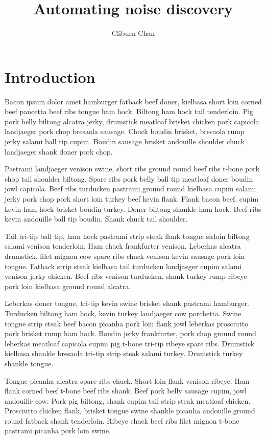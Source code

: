 \documentclass{article}
\begin{document}
\title{Automating noise discovery}
\author{Cliburn Chan}
\maketitle

\section{Introduction}

Bacon ipsum dolor amet hamburger fatback beef doner, kielbasa short loin corned beef pancetta beef ribs tongue ham hock. Biltong ham hock tail tenderloin. Pig pork belly biltong alcatra jerky, drumstick meatloaf brisket chicken pork capicola landjaeger pork chop bresaola sausage. Chuck boudin brisket, bresaola rump jerky salami ball tip cupim. Boudin sausage brisket andouille shoulder chuck landjaeger shank doner pork chop.

Pastrami landjaeger venison swine, short ribs ground round beef ribs t-bone pork chop tail shoulder biltong. Spare ribs pork belly ball tip meatloaf doner boudin jowl capicola. Beef ribs turducken pastrami ground round kielbasa cupim salami jerky pork chop pork short loin turkey beef kevin flank. Flank bacon beef, cupim kevin ham hock brisket boudin turkey. Doner biltong shankle ham hock. Beef ribs kevin andouille ball tip boudin. Shank chuck tail shoulder.

Tail tri-tip ball tip, ham hock pastrami strip steak flank tongue sirloin biltong salami venison tenderloin. Ham chuck frankfurter venison. Leberkas alcatra drumstick, filet mignon cow spare ribs chuck venison kevin sausage pork loin tongue. Fatback strip steak kielbasa tail turducken landjaeger cupim salami venison jerky chicken. Beef ribs venison turducken, shank turkey rump ribeye pork loin kielbasa ground round alcatra.

Leberkas doner tongue, tri-tip kevin swine brisket shank pastrami hamburger. Turducken biltong ham hock, kevin turkey landjaeger cow porchetta. Swine tongue strip steak beef bacon picanha pork loin flank jowl leberkas prosciutto pork brisket rump ham hock. Boudin jerky frankfurter, pork chop ground round leberkas meatloaf capicola cupim pig t-bone tri-tip ribeye spare ribs. Drumstick kielbasa shankle bresaola tri-tip strip steak salami turkey. Drumstick turkey shankle tongue.

Tongue picanha alcatra spare ribs chuck. Short loin flank venison ribeye. Ham flank corned beef t-bone beef ribs shank. Beef pork belly sausage cupim, jowl andouille cow. Pork pig biltong, shank cupim tail strip steak meatloaf chicken. Prosciutto chicken flank, brisket tongue swine shankle picanha andouille ground round fatback shank tenderloin. Ribeye chuck beef ribs filet mignon t-bone pastrami picanha pork loin swine.
\end{document}
